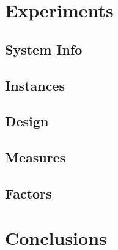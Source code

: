 \documentclass{DIKU-report}
\begin{document}
\vspace*{\fill}
\newpage
\addvspace{\bigskipamount}
\section*{Experiments}
\subsection*{System Info}



\subsection*{Instances}
\subsection*{Design}
\subsection*{Measures}
\subsection*{Factors}
\vspace*{\fill}
\newpage
\addvspace{\bigskipamount}
\section*{Conclusions}

%


\end{document}
